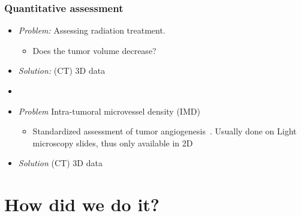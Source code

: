 \documentclass[final]{beamer}
\newcommand{\uct}{\si{\micro}CT\xspace} %
\begin{document}
\begin{frame}
	\frametitle{Quantitative assessment}
	\begin{itemize}
		\item \emph{Problem:} Assessing radiation treatment.
		\begin{itemize}
			\item Does the tumor volume decrease?
		\end{itemize}
		\pause
		\item \emph{Solution:} (\uct) 3D data
		\item[]	
		\pause	
		\item \emph{Problem} Intra-tumoral microvessel density (IMD)
		\begin{itemize}
			\item Standardized assessment of tumor angiogenesis~\cite{Hasan2002}.
				Usually done on Light microscopy slides, thus only available in 2D
		\end{itemize}
		\pause
		\item \emph{Solution} (\uct) 3D data
	\end{itemize}
\end{frame}

\section{How did we do it?}
\end{document}

